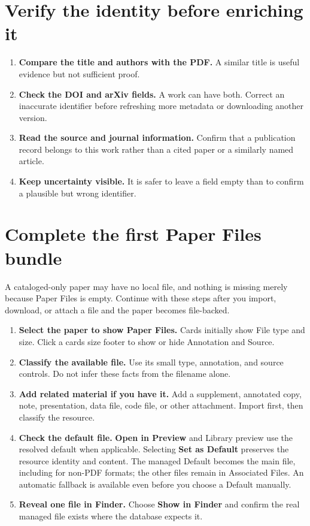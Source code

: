 \documentclass[10pt,letterpaper,oneside]{scrreprt}
\providecommand{\tightlist}{\setlength{\itemsep}{1pt}\setlength{\parskip}{0pt}}
\begin{document}
\section{Verify the identity before enriching it}\label{verify-the-identity-before-enriching-it}

\begin{enumerate}
\tightlist
\item
  \textbf{Compare the title and authors with the PDF.} A similar title is useful evidence but not sufficient proof.
\item
  \textbf{Check the DOI and arXiv fields.} A work can have both. Correct an inaccurate identifier before refreshing more metadata or downloading another version.
\item
  \textbf{Read the source and journal information.} Confirm that a publication record belongs to this work rather than a cited paper or a similarly named article.
\item
  \textbf{Keep uncertainty visible.} It is safer to leave a field empty than to confirm a plausible but wrong identifier.
\end{enumerate}

\section{Complete the first Paper Files bundle}\label{complete-the-first-paper-files-bundle}

A cataloged-only paper may have no local file, and nothing is missing merely because Paper Files is empty. Continue with these steps after you import, download, or attach a file and the paper becomes file-backed.

\begin{enumerate}
\tightlist
\item
  \textbf{Select the paper to show \textbf{Paper Files}.} Cards initially show File type and size. Click a card\textquotesingle s size footer to show or hide Annotation and Source.
\item
  \textbf{Classify the available file.} Use its small type, annotation, and source controls. Do not infer these facts from the filename alone.
\item
  \textbf{Add related material if you have it.} Add a supplement, annotated copy, note, presentation, data file, code file, or other attachment. Import first, then classify the resource.
\item
  \textbf{Check the default file.} \textbf{Open in Preview} and Library preview use the resolved default when applicable. Selecting \textbf{Set as Default} preserves the resource identity and content. The managed Default becomes the main file, including for non-PDF formats; the other files remain in Associated Files. An automatic fallback is available even before you choose a Default manually.
\item
  \textbf{Reveal one file in Finder.} Choose \textbf{Show in Finder} and confirm the real managed file exists where the database expects it.
\end{enumerate}
\end{document}

